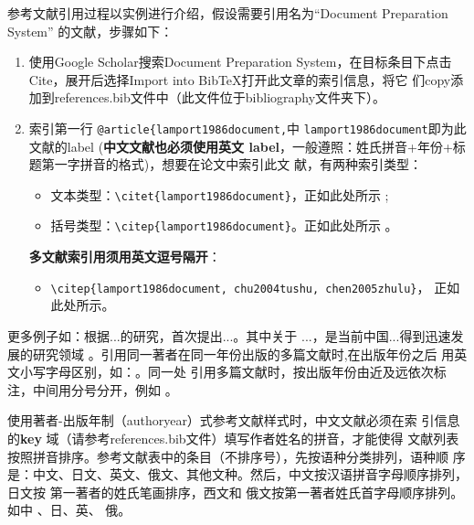 参考文献引用过程以实例进行介绍，假设需要引用名为``Document Preparation System''
的文献，步骤如下：
\begin{enumerate}
    \item 使用Google Scholar搜索Document Preparation System，在目标条目下点击
    Cite，展开后选择Import into BibTeX打开此文章的索引信息，将它
    们copy添加到references.bib文件中（此文件位于bibliography文件夹下）。
    \item 索引第一行 \verb|@article{lamport1986document,|中
    \verb|lamport1986document|即为此文献的label (\textbf{中文文献也必须使用英文
    label}，一般遵照：姓氏拼音+年份+标题第一字拼音的格式)，想要在论文中索引此文
    献，有两种索引类型：
    \begin{itemize}
        \item 文本类型：\verb|\citet{lamport1986document}|，正如此处所示
        \citet{lamport1986document}; 
        \item 括号类型：\verb|\citep{lamport1986document}|。正如此处所示
        \citep{lamport1986document}。
    \end{itemize}
    \textbf{多文献索引用须用英文逗号隔开}：
    \begin{itemize}
        \item \verb|\citep{lamport1986document, chu2004tushu, chen2005zhulu}|，
        正如此处所示\citep{lamport1986document, chu2004tushu, chen2005zhulu}。
    \end{itemize}
\end{enumerate}

更多例子如：\citet{walls2013drought}根据...的研究，首次提出...。其中关于
...\citep{walls2013drought}，是当前中国...得到迅速发展的研究领域
\citep{chen1980zhongguo}。引用同一著者在同一年份出版的多篇文献时,在出版年份之后
用英文小写字母区别，如：\citep{yuan2012lana, yuan2012lanb, yuan2012lanc}。同一处
引用多篇文献时，按出版年份由近及远依次标注，中间用分号分开，例如
\citep{chen1980zhongguo, stamerjohanns2009mathml, hls2012jinji, niu2013zonghe}。

使用著者-出版年制（authoryear）式参考文献样式时，中文文献必须在索
引信息的\textbf{key} 域（请参考references.bib文件）填写作者姓名的拼音，才能使得
文献列表按照拼音排序。参考文献表中的条目（不排序号），先按语种分类排列，语种顺
序是：中文、日文、英文、俄文、其他文种。然后，中文按汉语拼音字母顺序排列，日文按
第一著者的姓氏笔画排序，西文和 俄文按第一著者姓氏首字母顺序排列。如中
\citep{niu2013zonghe}、日\citep{Bohan1928}、英\citep{stamerjohanns2009mathml}、
俄\citep{Dubrovin1906}。

